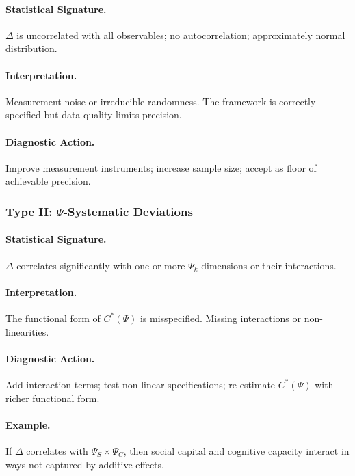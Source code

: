 \paragraph{Statistical Signature.}
$\Delta$ is uncorrelated with all observables; no autocorrelation; 
approximately normal distribution.

\paragraph{Interpretation.}
Measurement noise or irreducible randomness. The framework is correctly 
specified but data quality limits precision.

\paragraph{Diagnostic Action.}
Improve measurement instruments; increase sample size; accept as floor 
of achievable precision.

\subsubsection{Type II: $\Psi$-Systematic Deviations}

\paragraph{Statistical Signature.}
$\Delta$ correlates significantly with one or more $\Psi_k$ dimensions 
or their interactions.

\paragraph{Interpretation.}
The functional form of $C^*(\Psi)$ is misspecified. Missing interactions 
or non-linearities.

\paragraph{Diagnostic Action.}
Add interaction terms; test non-linear specifications; re-estimate $C^*(\Psi)$ 
with richer functional form.

\paragraph{Example.}
If $\Delta$ correlates with $\Psi_S \times \Psi_C$, then social capital and 
cognitive capacity interact in ways not captured by additive effects.

